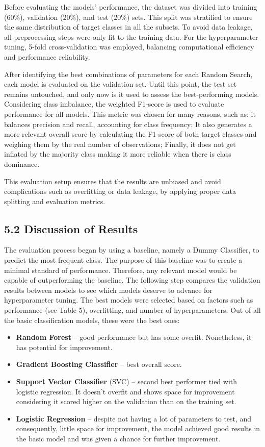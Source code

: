 \documentclass[a4paper,oneside,bibliography=totoc]{scrbook}
\begin{document}
Before evaluating the models' performance, the dataset was divided into training (60\%), validation (20\%), and test (20\%) sets. This split was stratified to ensure the same distribution of target classes in all the subsets. To avoid data leakage, all preprocessing steps were only fit to the training data. For the hyperparameter tuning, 5-fold cross-validation was employed, balancing computational efficiency and performance reliability. 

After identifying the best combinations of parameters for each Random Search, each model is evaluated on the validation set. Until this point, the test set remains untouched, and only now is it used to assess the best-performing models. Considering class imbalance, the weighted F1-score is used to evaluate performance for all models. This metric was chosen for many reasons, such as: it balances precision and recall, accounting for class frequency; It also generates a more relevant overall score by calculating the F1-score of both target classes and weighing them by the real number of observations; Finally, it does not get inflated by the majority class making it more reliable when there is class dominance. 

This evaluation setup ensures that the results are unbiased and avoid complications such as overfitting or data leakage, by applying proper data splitting and evaluation metrics. 

\subsection*{5.2 Discussion of Results}

The evaluation process began by using a baseline, namely a Dummy Classifier, to predict the most frequent class. The purpose of this baseline was to create a minimal standard of performance. Therefore, any relevant model would be capable of outperforming the baseline. The following step compares the validation results between models to see which models deserve to advance for hyperparameter tuning. The best models were selected based on factors such as performance (see Table 5), overfitting, and number of hyperparameters. Out of all the basic classification models, these were the best ones:


\begin{itemize}
	\item \textbf{Random Forest} – good performance but has some overfit. Nonetheless, it has potential for improvement. 
	\item \textbf{Gradient Boosting Classifier} – best overall score.
	\item \textbf{Support Vector Classifier} (SVC) – second best performer tied with logistic regression. It doesn’t overfit and shows space for improvement considering it scored higher on the validation than on the training set. 
	\item \textbf{Logistic Regression} – despite not having a lot of parameters to test, and consequently, little space for improvement, the model achieved good results in the basic model and was given a chance for further improvement.
\end{itemize}
\end{document}

